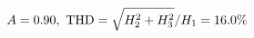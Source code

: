 \documentclass[preview]{standalone}
\begin{document}
\begin{align*}
\special{dvisvgm:raw <g id='unique000'>}A=0.90,\ \text{THD}=\sqrt{H_2^2+H_3^2}/H_1=16.0\%\special{dvisvgm:raw </g>}
\end{align*}
\end{document}
